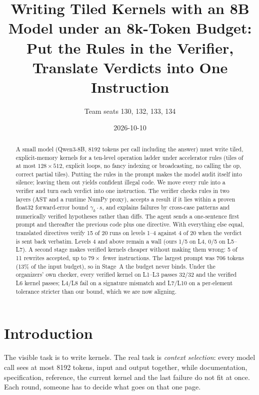 \documentclass[11pt]{article}
\title{Writing Tiled Kernels with an 8B Model under an 8k-Token Budget:\\[2pt]
\large Put the Rules in the Verifier, Translate Verdicts into One Instruction}
\author{Team seats 130, 132, 133, 134}
\date{2026-10-10}
\begin{document}
\maketitle

\begin{abstract}
\noindent
A small model (Qwen3-8B, 8192 tokens per call including the answer) must write tiled,
explicit-memory kernels for a ten-level operation ladder under accelerator rules (tiles of at most
$128\times512$, explicit loops, no fancy indexing or broadcasting, no calling the op, correct partial
tiles). Putting the rules in the prompt makes the model audit itself into silence; leaving them out
yields confident illegal code. We move every rule into a verifier and turn each verdict into one
instruction. The verifier checks rules in two layers (AST and a runtime NumPy proxy), accepts a
result if it lies within a proven float32 forward-error bound $\gamma_k\cdot s$, and explains failures by
cross-case patterns and numerically verified hypotheses rather than diffs. The agent sends a
one-sentence first prompt and thereafter the previous code plus one directive. With everything
else equal, translated directives verify 15 of 20 runs on levels 1--4 against 4 of 20 when the
verdict is sent back verbatim. Levels 4 and above remain a wall (ours 1/5 on L4, 0/5 on L5--L7).
A second stage makes verified kernels cheaper without making them wrong: 5 of 11 rewrites accepted,
up to $79\times$ fewer instructions. The largest prompt was 706 tokens (13\% of the input budget), so
in Stage~A the budget never binds. Under the organizers' own checker, every verified kernel on L1--L3
passes 32/32 and the verified L6 kernel passes; L4/L8 fail on a signature mismatch and L7/L10 on a
per-element tolerance stricter than our bound, which we are now aligning.
\end{abstract}

\tableofcontents

\section{Introduction}

The visible task is to write kernels. The real task is \emph{context selection}: every model call
sees at most 8192 tokens, input and output together, while documentation, specification, reference,
the current kernel and the last failure do not fit at once. Each round, someone has to decide what
goes on that one page.
\end{document}
